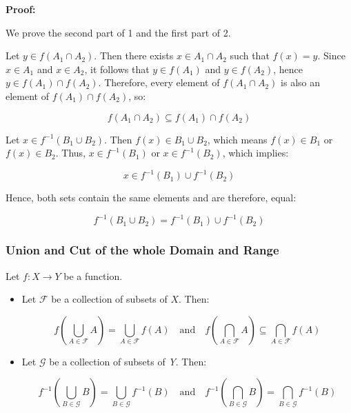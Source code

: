 \textbf{Proof:}

We prove the second part of 1 and the first part of 2.

Let \( y \in f(A_1 \cap A_2) \). Then there exists \( x \in A_1 \cap A_2 \) such that 
\( f(x) = y \). Since \( x \in A_1 \) and \( x \in A_2 \), it follows that \( y \in f(A_1) \) 
and \( y \in f(A_2) \), hence \( y \in f(A_1) \cap f(A_2) \). Therefore, every element of 
\( f(A_1 \cap A_2) \) is also an element of \( f(A_1) \cap f(A_2) \), so:

\[
	f(A_1 \cap A_2) \subseteq f(A_1) \cap f(A_2)
\]

Let \( x \in f^{-1} (B_1 \cup B_2) \). Then \( f(x) \in B_1 \cup B_2 \), which means \( f(x) \in B_1 \) 
or \( f(x) \in B_2 \). Thus, \( x \in f^{-1}(B_1) \) 
or \( x \in f^{-1}(B_2) \), which implies:
	      
\[
	 x \in f^{-1}(B_1) \cup f^{-1}(B_2)
\]

Hence, both sets contain the same elements and are therefore, equal:
	      
\[
	f^{-1}(B_1 \cup B_2) = f^{-1}(B_1) \cup f^{-1}(B_2)
\]

\QED

\subsubsection{Union and Cut of the whole Domain and Range}

Let \( f : X \to Y \) be a function.

\begin{itemize}

	\item Let \( \mathcal{F} \) be a collection of subsets of \(X\). Then:

   	      \[
		      f\left( \bigcup_{A \in \mathcal{F}} A \right) = \bigcup_{A \in \mathcal{F}} f(A)
		      \quad \text{and} \quad
		      f\left( \bigcap_{A \in \mathcal{F}} A \right) \subseteq \bigcap_{A \in \mathcal{F}} f(A)
	      \]

	\item Let \( \mathcal{G} \) be a collection of subsets of \emph{Y}. Then:

	      \[
		      f^{-1}\left( \bigcup_{B \in \mathcal{G}} B \right) = \bigcup_{B \in \mathcal{G}} f^{-1}(B)
		      \quad \text{and} \quad
		      f^{-1}\left( \bigcap_{B \in \mathcal{G}} B \right) = \bigcap_{B \in \mathcal{G}} f^{-1}(B)
	      \]

\end{itemize}


